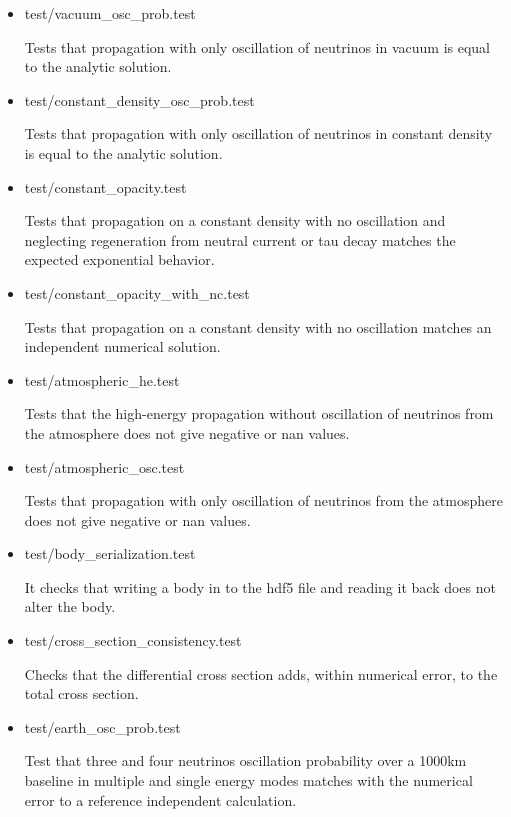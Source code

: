 \documentclass[3p,12pt]{elsarticle}
\newcommand{\ttf}{\ttfamily}
\begin{document}
\begin{itemize}
  
\item {\ttf test/vacuum\_osc\_prob.test}
  
  Tests that propagation with only oscillation of
  neutrinos in vacuum is equal to the analytic solution.

\item {\ttf test/constant\_density\_osc\_prob.test}
  
  Tests that propagation with only oscillation of
  neutrinos in constant density is equal to the analytic solution.

\item {\ttf test/constant\_opacity.test}
  
  Tests that propagation on a constant density with no oscillation and
  neglecting regeneration from neutral current or tau decay matches
  the expected exponential behavior.
  
\item {\ttf test/constant\_opacity\_with\_nc.test}
  
  Tests that propagation on a constant density with no oscillation 
  matches an independent numerical solution.  
  
\item {\ttf test/atmospheric\_he.test}

  Tests that the high-energy propagation without oscillation of
  neutrinos from the atmosphere does not give negative or {\ttf nan} values.

\item {\ttf test/atmospheric\_osc.test}
  
  Tests that propagation with only oscillation of
  neutrinos from the atmosphere does not give negative or {\ttf nan}
  values.
  
\item {\ttf test/body\_serialization.test}
  
  It checks that writing a body in to the hdf5 file and reading it
  back does not alter the body.  

\item {\ttf test/cross\_section\_consistency.test}
  
  Checks that the differential cross section adds, within numerical error,
  to the total cross section.
  
\item {\ttf test/earth\_osc\_prob.test}
  
  Test that three and four neutrinos oscillation probability over a
  1000km baseline in multiple and single energy modes matches with the
  numerical error to a reference independent calculation.
  

\end{itemize}
\end{document}
